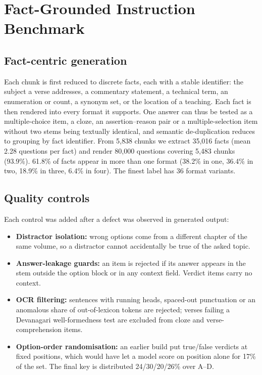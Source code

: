 \documentclass[10pt,twocolumn,letterpaper]{article}
\begin{document}
\section{Fact-Grounded Instruction Benchmark}
\label{sec:benchmark}

\subsection{Fact-centric generation}

Each chunk is first reduced to discrete facts, each with a stable identifier:
the subject a verse addresses, a commentary statement, a technical term, an
enumeration or count, a synonym set, or the location of a teaching. Each fact
is then rendered into every format it supports. One answer can thus be tested
as a multiple-choice item, a cloze, an assertion--reason pair or a
multiple-selection item without two stems being textually identical, and
semantic de-duplication reduces to grouping by fact identifier. From 5{,}838
chunks we extract 35{,}016 facts (mean 2.28 questions per fact) and render
80{,}000 questions covering 5{,}483 chunks (93.9\%). 61.8\% of facts appear in
more than one format (38.2\% in one, 36.4\% in two, 18.9\% in three, 6.4\% in
four). The finest label has 36 format variants.

\subsection{Quality controls}

Each control was added after a defect was observed in generated output:
\begin{itemize}\itemsep1.5pt
\item \textbf{Distractor isolation:} wrong options come from a different chapter
of the same volume, so a distractor cannot accidentally be true of the asked topic.
\item \textbf{Answer-leakage guards:} an item is rejected if its answer appears
in the stem outside the option block or in any context field. Verdict items carry
no context.
\item \textbf{OCR filtering:} sentences with running heads, spaced-out
punctuation or an anomalous share of out-of-lexicon tokens are rejected; verses
failing a Devanagari well-formedness test are excluded from cloze and
verse-comprehension items.
\item \textbf{Option-order randomisation:} an earlier build put true/false
verdicts at fixed positions, which would have let a model score on position alone
for 17\% of the set. The final key is distributed 24/30/20/26\% over A--D.
\end{itemize}
\end{document}
